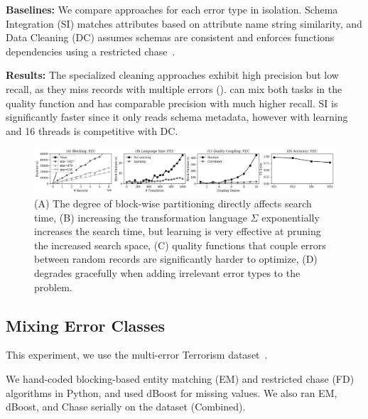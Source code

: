 \vspace{0.5em}\noindent\textbf{Baselines: } We compare approaches for each error type in isolation.  Schema Integration  (SI) matches attributes based on attribute name string similarity, and Data Cleaning (DC) assumes schemas are consistent and enforces functions dependencies using a restricted chase~\cite{benedikt2017benchmarking}.

\vspace{0.5em}\noindent\textbf{Results: } The specialized cleaning approaches exhibit high precision but low recall, as they miss records with multiple errors ().  \sys can mix both tasks in the quality function and has comparable precision with much higher recall.  SI is significantly faster since it only reads schema metadata, however \sys with learning and 16 threads is competitive with DC.  
\begin{figure}[ht]
\centering
 \includegraphics[width=\textwidth]{exp/exp4.png}
 \caption{\small (A) The degree of block-wise partitioning directly affects search time, (B) increasing the transformation language $\Sigma$ exponentially increases the search time, but learning is very effective at pruning the increased search space, (C) quality functions that couple errors between random records are significantly harder to optimize, (D) \sys degrades gracefully when adding irrelevant error types to the problem.  
 \label{fig:microbenchmarks}}
\end{figure}

\subsection{Mixing Error Classes}\label{s:expterror}
This experiment, we use the multi-error Terrorism dataset~\cite{data-terrorism}. 

 We hand-coded blocking-based entity matching (EM)  and restricted chase (FD) algorithms in Python, and used dBoost for missing values.  We also ran EM, dBoost, and Chase serially on the dataset (Combined). 



